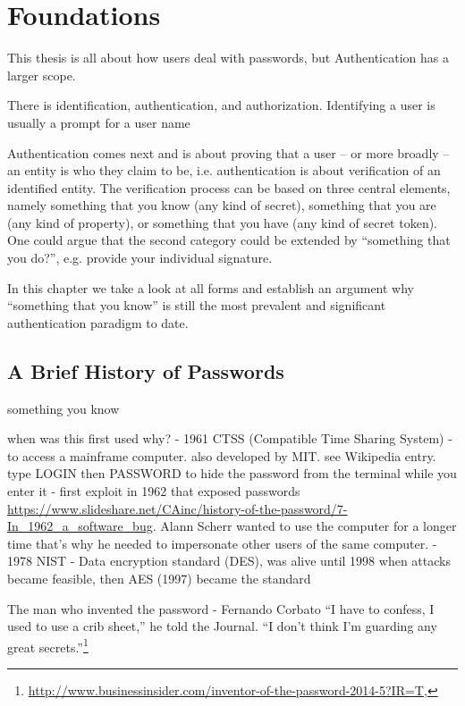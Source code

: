 \chapter[Foundations]{Foundations}\label{chap:rw:passwords}


This thesis is all about how users deal with passwords, but Authentication has a larger scope. 

There is identification, authentication, and authorization. 
Identifying a user is usually a prompt for a user name

Authentication comes next and is about proving that a user -- or more broadly -- an entity is who they claim to be, i.e. authentication is about verification of an identified entity. The verification process can be based on three central elements, namely something that you know (any kind of secret), something that you are (any kind of property), or something that you have (any kind of secret token). One could argue that the second category could be extended by ``something that you do?'', e.g. provide your individual signature.

In this chapter we take a look at all forms and establish an argument why ``something that you know'' is still the most prevalent and significant authentication paradigm to date. 
\section{A Brief History of Passwords}
something you know 

when was this first used why?
- 1961 CTSS (Compatible Time Sharing System) - to access a mainframe computer. also developed by MIT. see Wikipedia entry.
type LOGIN then PASSWORD to hide the password from the terminal while you enter it
- first exploit in 1962 that exposed passwords \url{https://www.slideshare.net/CAinc/history-of-the-password/7-In_1962_a_software_bug}. 
Alann Scherr wanted to use the computer for a longer time that's why he needed to impersonate other users of the same computer.
- 1978 NIST - Data encryption standard (DES), was alive until 1998 when attacks became feasible, then AES (1997) became the standard


The man who invented the password - Fernando Corbato 
``I have to confess, I used to use a crib sheet,'' he told the Journal. ``I don't think I'm guarding any great secrets.''\footnote{\label{foot:burr_regrets}\url{http://www.businessinsider.com/inventor-of-the-password-2014-5?IR=T}, }

